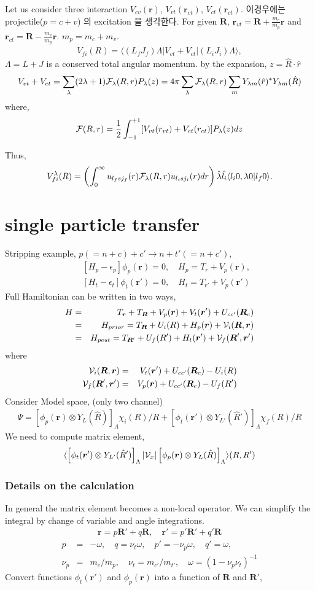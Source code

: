 \documentclass[11pt]{book}
\def\bm{\boldsymbol}
\def\vr{{\bm r}}
\def\vR{{\bm R}}
\def\la{\langle}
\def\ra{\rangle}
\newcommand{\bea}{\begin{eqnarray}}
\newcommand{\eea}{\end{eqnarray}}
\newcommand{\no}{\nonumber \\}
\begin{document}
Let us consider three interaction $V_{cv}(\vr)$, $V_{vt}(\vr_{vt})$, 
$V_{ct}(\vr_{ct})$. 이경우에는 projectile($p=c+v$) 의 excitation 을 생각한다.
For given $\vR$, 
$\vr_{vt}=\vR+\frac{m_c}{m_p}\vr$
and $\vr_{ct}=\vR-\frac{m_v}{m_p}\vr$. $m_p=m_c+m_v$.
\bea 
V_{fi}(R)=\la (L_f J_f)\Lambda|V_{vt}+V_{ct}|(L_i J_i)\Lambda\ra, 
\eea 
$\Lambda=L+J$ is a conserved total angular momentum. 
by the expansion, $z=\hat{R}\cdot\hat{r}$
\bea 
V_{vt}+V_{ct}=\sum_{\lambda}(2\lambda+1){\cal F}_\lambda(R,r) P_\lambda(z)
             =4\pi \sum_{\lambda}{\cal F}_\lambda(R,r)
              \sum_{m} Y_{\lambda m}(\hat{r})^* Y_{\lambda m}(\hat{R})
\eea 
where,
\bea 
{\cal F}(R,r)=\frac{1}{2}\int_{-1}^{+1}[ V_{vt}(r_{vt})+V_{ct}(r_{ct})]P_\lambda(z) dz
\eea 

Thus,
\bea 
V_{fi}^\lambda(R)
=\left( \int_0^\infty u_{l_f s j_f}(r) {\cal F}_\lambda(R,r) u_{l_i s j_i}(r) dr\right)
  \hat{\lambda}\hat{l_i} \la l_i 0,\lambda 0|l_f 0\ra. 
\eea 

\section{single particle transfer} 
 
Stripping example, $p(=n+c)+c'\to n+t'(=n+c')$, 
 \bea 
 & &[ H_p-\epsilon_p]\phi_p(\vr)=0, \quad H_p=T_r+V_p(\vr),\no 
 & &[ H_t-\epsilon_t]\phi_t(\vr')=0, \quad H_t=T_{r'}+V_p(\vr')
 \eea 
Full Hamiltonian can be written in two ways,
\bea 
H&=&T_{\vr}+T_{\vR}+V_p(\vr)+V_t(\vr')+U_{cc'}(\vR_c)\no 
 &=&H_{prior}=T_{\vR}+U_i(R)+H_p(\vr)+{\cal V}_i(\vR,\vr)\no 
 &=&H_{post}=T_{\vR'}+U_f(R')+H_t(\vr')+{\cal V}_f(\vR',\vr')
 \eea 
 where
\bea 
{\cal V}_i(\vR,\vr)&=& V_t(\vr')+U_{cc'}(\vR_{c})-U_i(R) \no 
{\cal V}_f(\vR',\vr')&=& V_p(\vr)+U_{cc'}(\vR_{c})-U_f(R') 
\eea 
Consider Model space, (only two channel)
\bea 
\Psi=\left[\phi_p(\vr)\otimes Y_L(\hat{R})\right]_\Lambda \chi_i(R)/R
    +\left[\phi_t(\vr')\otimes Y_{L'}(\hat{R}')\right]_\Lambda \chi_f(R)/R
\eea 
We need to compute matrix element,
\bea 
\la \left[\phi_t(\vr')\otimes Y_{L'}(\hat{R}')\right]_\Lambda|
               {\cal V}_x |\left[\phi_p(\vr)\otimes Y_L(\hat{R})\right]_\Lambda\ra (R,R')
\eea  

\subsubsection{Details on the calculation}
In general the matrix element becomes a non-local operator.
We can simplify the integral by change of variable and angle integrations. 
\bea
\vr=p\vR'+q\vR,\quad \vr'=p'\vR'+q'\vR 
\eea 
\bea 
p&=&-\omega, \quad q=\nu_t \omega, \quad p'=-\nu_p\omega,\quad q'=\omega,\no 
\nu_p&=&m_c/m_p,\quad \nu_t=m_{c'}/m_{t'},\quad \omega=(1-\nu_p\nu_t)^{-1} 
\eea  
Convert functions $\phi_t(\vr')$ and $\phi_p(\vr)$ into a function of $\vR$ and $\vR'$,
\end{document}
